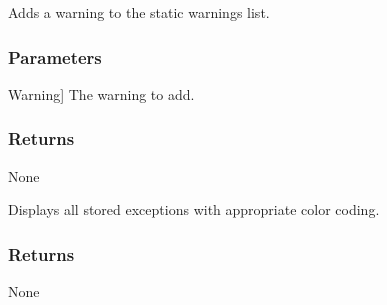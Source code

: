 \documentclass[letterpaper,10pt,english]{sphinxmanual}
\begin{document}
\begin{fulllineitems}
\begin{fulllineitems}
\end{fulllineitems}


\begin{fulllineitems}
\label{\detokenize{exception:exception.My_Exception.add_warning}}
\pysigstartsignatures
{}
\pysigstopsignatures
\sphinxAtStartPar
Adds a warning to the static warnings list.


\subsubsection{Parameters}
\label{\detokenize{exception:id1}}\begin{description}
\sphinxlineitem{w}{[}Warning{]}
\sphinxAtStartPar
The warning to add.

\end{description}


\subsubsection{Returns}
\label{\detokenize{exception:id2}}
\sphinxAtStartPar
None

\end{fulllineitems}


\begin{fulllineitems}
\label{\detokenize{exception:exception.My_Exception.display_exceptions}}
\pysigstartsignatures
{}
\pysigstopsignatures
\sphinxAtStartPar
Displays all stored exceptions with appropriate color coding.


\subsubsection{Returns}
\label{\detokenize{exception:id3}}
\sphinxAtStartPar
None


\end{fulllineitems}
\end{fulllineitems}
\end{document}
